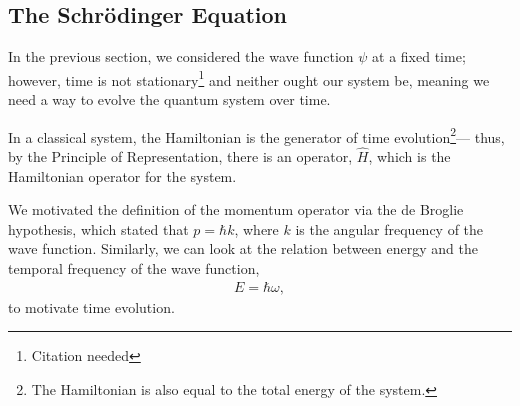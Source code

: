 \documentclass[10pt]{extarticle}
\theoremstyle{plain}
\theoremstyle{definition}
\theoremstyle{remark}
\renewcommand{\newline}{\hfill\break}
\begin{document}
  \subsection{The Schrödinger Equation}%
  In the previous section, we considered the wave function $\psi$ at a fixed time; however, time is not stationary\footnote{Citation needed} and neither ought our system be, meaning we need a way to evolve the quantum system over time.\newline

  In a classical system, the Hamiltonian is the generator of time evolution\footnote{The Hamiltonian is also equal to the total energy of the system.}--- thus, by the Principle of Representation, there is an operator, $\hat{H}$, which is the Hamiltonian operator for the system.\newline

  We motivated the definition of the momentum operator via the de Broglie hypothesis, which stated that $p = \hbar k$, where $k$ is the angular frequency of the wave function. Similarly, we can look at the relation between energy and the temporal frequency of the wave function,
  \begin{align*}
    E = \hbar \omega,
  \end{align*}
  to motivate time evolution.\newline
\end{document}
